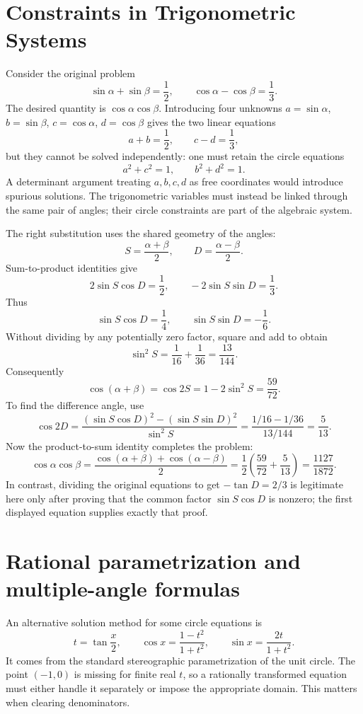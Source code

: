 
\section{Constraints in Trigonometric Systems}

Consider the original problem
\[
 \sin\alpha+\sin\beta=\frac12,\qquad
 \cos\alpha-\cos\beta=\frac13.
\]
The desired quantity is \(\cos\alpha\cos\beta\). Introducing four unknowns \(a=\sin\alpha\), \(b=\sin\beta\), \(c=\cos\alpha\), \(d=\cos\beta\) gives the two linear equations
\[
 a+b=\frac12,\qquad c-d=\frac13,
\]
but they cannot be solved independently: one must retain the circle equations
\[
 a^2+c^2=1,\qquad b^2+d^2=1.
\]
A determinant argument treating \(a,b,c,d\) as free coordinates would introduce spurious solutions. The trigonometric variables must instead be linked through the same pair of angles; their circle constraints are part of the algebraic system.

The right substitution uses the shared geometry of the angles:
\[
 S=\frac{\alpha+\beta}{2},\qquad D=\frac{\alpha-\beta}{2}.
\]
Sum-to-product identities give
\[
 2\sin S\cos D=\frac12,\qquad
 -2\sin S\sin D=\frac13.
\]
Thus
\[
 \sin S\cos D=\frac14,\qquad
 \sin S\sin D=-\frac16.
\]
Without dividing by any potentially zero factor, square and add to obtain
\[
 \sin^2S=\frac1{16}+\frac1{36}=\frac{13}{144}.
\]
Consequently
\[
 \cos(\alpha+\beta)=\cos2S=1-2\sin^2S=\frac{59}{72}.
\]
To find the difference angle, use
\[
 \cos2D
 =\frac{(\sin S\cos D)^2-(\sin S\sin D)^2}{\sin^2S}
 =\frac{1/16-1/36}{13/144}=\frac5{13}.
\]
Now the product-to-sum identity completes the problem:
\[
 \boxed{\cos\alpha\cos\beta
  =\frac{\cos(\alpha+\beta)+\cos(\alpha-\beta)}2
  =\frac12\left(\frac{59}{72}+\frac5{13}\right)
  =\frac{1127}{1872}.}
\]
In contrast, dividing the original equations to get
\(-\tan D=2/3\) is legitimate here only after proving that the common factor \(\sin S\cos D\) is nonzero; the first displayed equation supplies exactly that proof.

\section{Rational parametrization and multiple-angle formulas}

An alternative solution method for some circle equations is
\[
 t=\tan\frac{x}{2},\qquad
 \cos x=\frac{1-t^2}{1+t^2},\qquad
 \sin x=\frac{2t}{1+t^2}.
\]
It comes from the standard stereographic parametrization of the unit circle. The point \((-1,0)\) is missing for finite real \(t\), so a rationally transformed equation must either handle it separately or impose the appropriate domain. This matters when clearing denominators.

